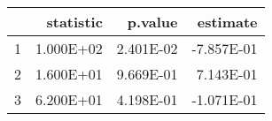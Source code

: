 \begin{table}[ht]
\centering
\begin{tabular}{rrrr}
  \hline
 & statistic & p.value & estimate \\ 
  \hline
1 & 1.000E+02 & 2.401E-02 & -7.857E-01 \\ 
  2 & 1.600E+01 & 9.669E-01 & 7.143E-01 \\ 
  3 & 6.200E+01 & 4.198E-01 & -1.071E-01 \\ 
   \hline
\end{tabular}
\end{table}
